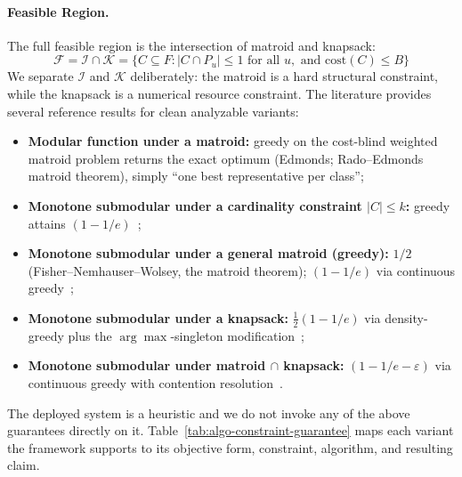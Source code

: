\documentclass[11pt, a4paper]{article}
\begin{document}
\paragraph{Feasible Region.} The full feasible region is the intersection of matroid and knapsack:
\begin{equation}
\mathcal{F} = \mathcal{I} \cap \mathcal{K} = \{C \subseteq F : |C \cap P_u| \leq 1 \text{ for all } u, \text{ and } \mathrm{cost}(C) \leq B\}
\end{equation}
We separate $\mathcal{I}$ and $\mathcal{K}$ deliberately: the matroid is a hard structural constraint, while the knapsack is a numerical resource constraint. The literature provides several reference results for clean analyzable variants:
\begin{itemize}
    \item \textbf{Modular function under a matroid:} greedy on the cost-blind weighted matroid problem returns the exact optimum (Edmonds; Rado--Edmonds matroid theorem), simply ``one best representative per class'';
    \item \textbf{Monotone submodular under a cardinality constraint $|C| \leq k$:} greedy attains $(1-1/e)$~\cite{nemhauser1978analysis};
    \item \textbf{Monotone submodular under a general matroid (greedy):} $1/2$~\cite{nemhauser1978analysis} (Fisher--Nemhauser--Wolsey, the matroid theorem); $(1-1/e)$ via continuous greedy~\cite{calinescu2011maximizing};
    \item \textbf{Monotone submodular under a knapsack:} $\frac{1}{2}(1-1/e)$ via density-greedy plus the $\arg\max$-singleton modification~\cite{sviridenko2004note,khuller1999budgeted};
    \item \textbf{Monotone submodular under matroid $\cap$ knapsack:} $(1-1/e-\varepsilon)$ via continuous greedy with contention resolution~\cite{chekuri2014submodular}.
\end{itemize}
The deployed system is a heuristic and we do not invoke any of the above guarantees directly on it. Table~\ref{tab:algo-constraint-guarantee} maps each variant the framework supports to its objective form, constraint, algorithm, and resulting claim.
\end{document}
